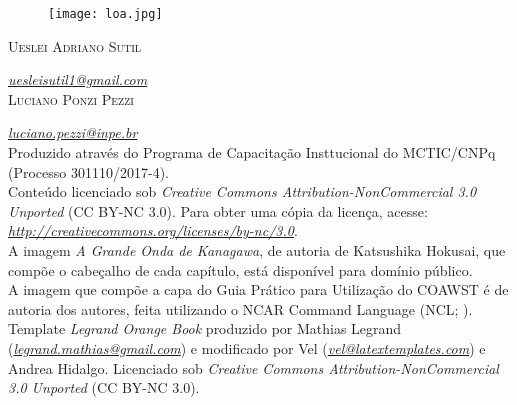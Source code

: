 \newpage
\thispagestyle{empty}

\begin{figure}[H]
    \centering
    \vspace*{\fill}
    \texttt{[image: loa.jpg]}
    \vspace{2cm}
\end{figure}


\noindent \textsc{Ueslei Adriano Sutil}

\noindent \textcolor{bleu_cite}{\href{uesleisutil1@gmail.com}{\textit{uesleisutil1@gmail.com}}} \\ %

\noindent \textsc{Luciano Ponzi Pezzi}

\noindent \textcolor{bleu_cite}{\href{luciano.pezzi@inpe.br}{\textit{luciano.pezzi@inpe.br}}} \\ %

\noindent Produzido através do Programa de Capacitação Insttucional do MCTIC/CNPq (Processo 301110/2017-4). \\

\noindent Conteúdo licenciado sob \textit{Creative Commons Attribution-NonCommercial 3.0 Unported} (CC BY-NC 3.0).
          Para obter uma cópia da licença, acesse: 
          \textcolor{bleu_cite}{\href{http://creativecommons.org/licenses/by-nc/3.0}{\textit{http://creativecommons.org/licenses/by-nc/3.0}}}. \\

\noindent A imagem \textit{A Grande Onda de Kanagawa}, de autoria de Katsushika Hokusai, que compõe o cabeçalho de cada capítulo,
          está disponível para domínio público.\\

\noindent A imagem que compõe a capa do Guia Prático para Utilização do COAWST é de autoria dos autores, feita 
          utilizando o NCAR Command Language (NCL; \cite{Ncl2017}).\\

\noindent Template \textit{Legrand Orange Book} produzido por Mathias Legrand 
          (\textcolor{bleu_cite}{\href{legrand.mathias@gmail.com}{\textit{legrand.mathias@gmail.com}}}) e modificado por 
          Vel (\textcolor{bleu_cite}{\href{vel@latextemplates.com}{\textit{vel@latextemplates.com}}}) e Andrea Hidalgo. 
          Licenciado sob \textit{Creative Commons Attribution-NonCommercial 3.0 Unported} (CC BY-NC 3.0).\\

